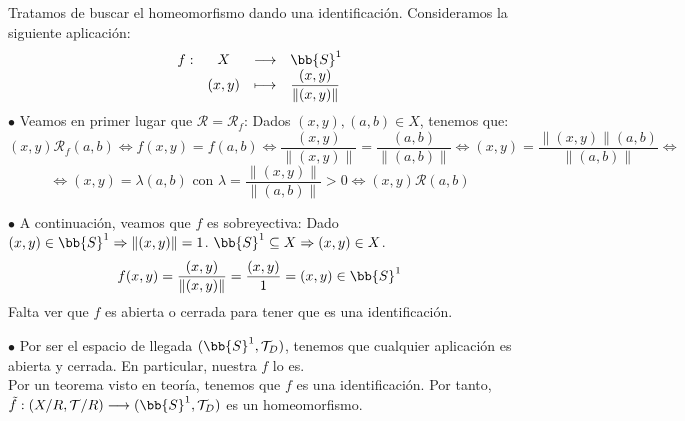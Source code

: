 \documentclass[12pt]{article}
\newcounter{ejercicio}[section] %
\newcounter{ejercicio}
\begin{document}
\begin{ejercicio}[4.5 puntos]
\begin{enumerate}[label=(\alph*)]
                \noindent
                Tratamos de buscar el homeomorfismo dando una identificación. Consideramos la siguiente aplicación:
                $$\begin{array}{cccl}
                    f: & X & \longrightarrow & \bb{S}^1 \\
                       & (x,y) & \longmapsto & \dfrac{(x,y)}{\|(x,y)\|}
                \end{array}$$
                $\bullet$ Veamos en primer lugar que $\mathcal{R} = \mathcal{R}_f$:\newline
                Dados $(x,y), (a,b) \in X$, tenemos que:
                $$(x,y)\mathcal{R}_f(a,b) \Leftrightarrow f(x,y) = f(a,b) \Leftrightarrow \dfrac{(x,y)}{\|(x,y)\|} = \dfrac{(a,b)}{\|(a,b)\|}\Leftrightarrow (x,y) = \dfrac{\|(x,y)\|(a,b)}{\|(a,b)\|} \Leftrightarrow$$
                $$\Leftrightarrow (x,y) = \lambda (a,b) \mbox{ con } \lambda = \dfrac{\|(x,y)\|}{\|(a,b)\|}>0 \Leftrightarrow (x,y)\mathcal{R}(a,b)$$

                \noindent
                $\bullet$ A continuación, veamos que $f$ es sobreyectiva:\newline
                Dado $(x,y) \in \bb{S}^1 \Rightarrow \|(x,y)\| = 1$. $\bb{S}^1 \subseteq X \Rightarrow (x,y) \in X$.
                $$f(x,y) = \dfrac{(x,y)}{\|(x,y)\|} = \dfrac{(x,y)}{1} = (x,y) \in \bb{S}^1$$
                Falta ver que $f$ es abierta o cerrada para tener que es una identificación.

                \noindent
                $\bullet$ Por ser el espacio de llegada $(\bb{S}^1, \mathcal{T}_D)$, tenemos que cualquier aplicación es abierta y cerrada. En particular, nuestra $f$ lo es.\\

                \noindent
                Por un teorema visto en teoría, tenemos que $f$ es una identificación. Por tanto, $\tilde{f}:(X/R, \mathcal{T}/R) \longrightarrow (\bb{S}^1, \mathcal{T}_D) $ es un homeomorfismo.


        \end{enumerate}
    \end{ejercicio}
        
\end{document}
